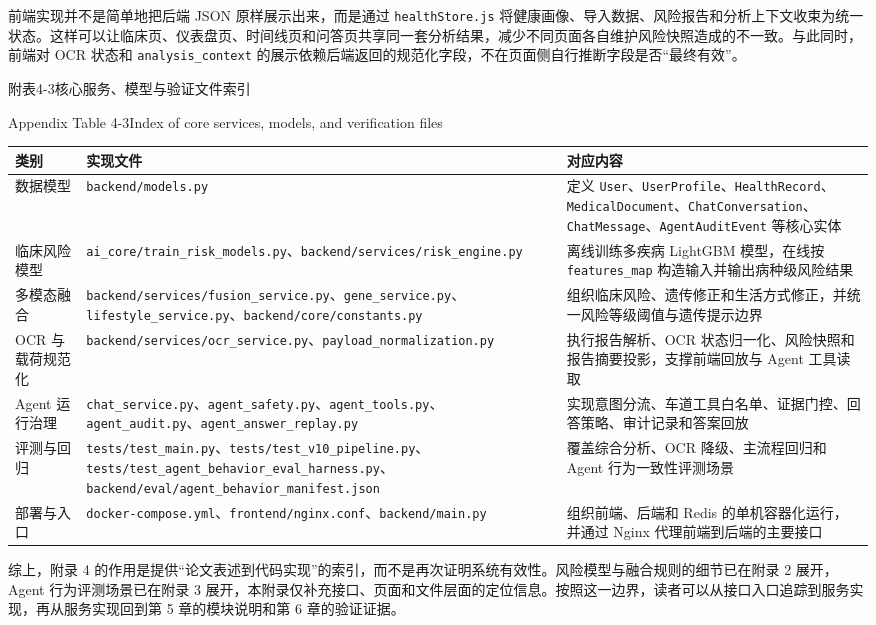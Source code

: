 \documentclass[UTF8, a4paper, 12pt, oneside]{ctexrep}
\numberwithin{equation}{chapter}
\newcommand{\codeid}[1]{{\begingroup\urlstyle{rm}\nolinkurl{#1}\endgroup}}
\begin{document}
{\vspace{\baselineskip}
前端实现并不是简单地把后端 JSON 原样展示出来，而是通过 \codeid{healthStore.js} 将健康画像、导入数据、风险报告和分析上下文收束为统一状态。这样可以让临床页、仪表盘页、时间线页和问答页共享同一套分析结果，减少不同页面各自维护风险快照造成的不一致。与此同时，前端对 OCR 状态和 \codeid{analysis_context} 的展示依赖后端返回的规范化字段，不在页面侧自行推断字段是否“最终有效”。

\vspace{0.5\baselineskip}
\begin{center}
{\songti{}附表4-3\quad 核心服务、模型与验证文件索引\par}
{\rmfamily{}Appendix Table 4-3\quad Index of core services, models, and verification files\par}
\end{center}
\vspace{-0.5\baselineskip}
{\songti{}
\noindent\begin{tabular}{@{}>{\raggedright\arraybackslash}p{} >{\raggedright\arraybackslash}p{} >{\raggedright\arraybackslash}p{}@{}}
\toprule
类别 & 实现文件 & 对应内容 \\
\midrule
数据模型 & \codeid{backend/models.py} & 定义 \codeid{User}、\codeid{UserProfile}、\codeid{HealthRecord}、\codeid{MedicalDocument}、\codeid{ChatConversation}、\codeid{ChatMessage}、\codeid{AgentAuditEvent} 等核心实体 \\
临床风险模型 & \codeid{ai_core/train_risk_models.py}、\codeid{backend/services/risk_engine.py} & 离线训练多疾病 LightGBM 模型，在线按 \codeid{features_map} 构造输入并输出病种级风险结果 \\
多模态融合 & \codeid{backend/services/fusion_service.py}、\codeid{gene_service.py}、\codeid{lifestyle_service.py}、\codeid{backend/core/constants.py} & 组织临床风险、遗传修正和生活方式修正，并统一风险等级阈值与遗传提示边界 \\
OCR 与载荷规范化 & \codeid{backend/services/ocr_service.py}、\codeid{payload_normalization.py} & 执行报告解析、OCR 状态归一化、风险快照和报告摘要投影，支撑前端回放与 Agent 工具读取 \\
Agent 运行治理 & \codeid{chat_service.py}、\codeid{agent_safety.py}、\codeid{agent_tools.py}、\codeid{agent_audit.py}、\codeid{agent_answer_replay.py} & 实现意图分流、车道工具白名单、证据门控、回答策略、审计记录和答案回放 \\
评测与回归 & \codeid{tests/test_main.py}、\codeid{tests/test_v10_pipeline.py}、\codeid{tests/test_agent_behavior_eval_harness.py}、\codeid{backend/eval/agent_behavior_manifest.json} & 覆盖综合分析、OCR 降级、主流程回归和 Agent 行为一致性评测场景 \\
部署与入口 & \codeid{docker-compose.yml}、\codeid{frontend/nginx.conf}、\codeid{backend/main.py} & 组织前端、后端和 Redis 的单机容器化运行，并通过 Nginx 代理前端到后端的主要接口 \\
\bottomrule
\end{tabular}
}

\vspace{\baselineskip}
综上，附录 4 的作用是提供“论文表述到代码实现”的索引，而不是再次证明系统有效性。风险模型与融合规则的细节已在附录 2 展开，Agent 行为评测场景已在附录 3 展开，本附录仅补充接口、页面和文件层面的定位信息。按照这一边界，读者可以从接口入口追踪到服务实现，再从服务实现回到第 5 章的模块说明和第 6 章的验证证据。
\par}
\clearpage
\end{document}
